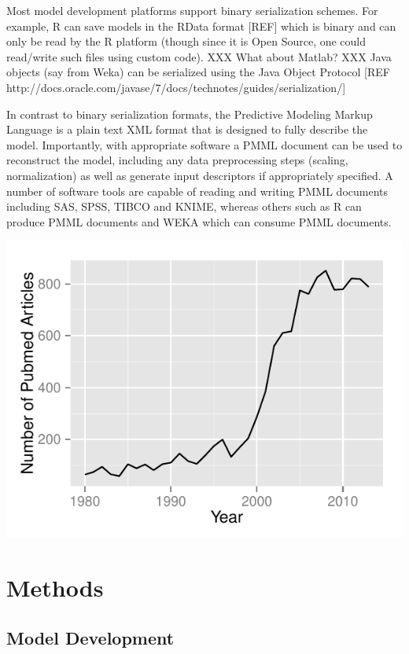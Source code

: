 \documentclass[12pt,letterpaper]{article}
\begin{document}
Most model development platforms support binary serialization
schemes. For example, R can save models in the RData format [REF]
which is binary and can only be read by the R platform (though since
it is Open Source, one could read/write such files using custom
code). XXX What about Matlab? XXX Java objects (say from Weka) can
be serialized using the Java Object Protocol [REF http://docs.oracle.com/javase/7/docs/technotes/guides/serialization/]

In contrast to binary serialization formats, the Predictive Modeling
Markup Language is a plain text XML format that is designed to fully
describe the model. Importantly, with appropriate software a PMML
document can be used to reconstruct the model, including any data
preprocessing steps (scaling, normalization) as well as generate input
descriptors if appropriately specified. A number of software tools are
capable of reading and writing PMML documents including SAS, SPSS,
TIBCO and KNIME, whereas others such as R can produce PMML documents
and WEKA which can consume PMML documents.


{}
{
  \includegraphics{img/count-qsar}
}

\section{Methods}
\label{sec:methods}

\subsection{Model Development}
\label{sec:model-development}
\end{document}
